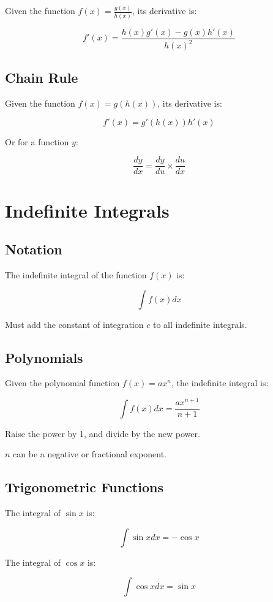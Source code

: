 \documentclass[a4paper,11pt]{article}
\begin{document}
Given the function $f(x) = \frac{g(x)}{h(x)}$, its derivative is:

$$
f'(x) = \frac{h(x) g'(x) - g(x) h'(x)}{h(x)^2}
$$


\subsection{Chain Rule}

Given the function $f(x) = g(h(x))$, its derivative is:

$$
f'(x) = g'(h(x)) h'(x)
$$

Or for a function $y$:

$$
\frac{dy}{dx} = \frac{dy}{du} \times \frac{du}{dx}
$$




\section{Indefinite Integrals}

\subsection{Notation}

The indefinite integral of the function $f(x)$ is:

$$
\int f(x) dx
$$

Must add the constant of integration $c$ to all indefinite integrals.


\subsection{Polynomials}

Given the polynomial function $f(x) = ax^n$, the indefinite integral is:

$$
\int f(x) dx = \frac{ax^{n + 1}}{n + 1}
$$

Raise the power by 1, and divide by the new power.

$n$ can be a negative or fractional exponent.


\subsection{Trigonometric Functions}

The integral of $\sin{x}$ is:

$$
\int \sin{x} dx = -\cos{x}
$$

The integral of $\cos{x}$ is:

$$
\int \cos{x} dx = \sin{x}
$$
\end{document}
